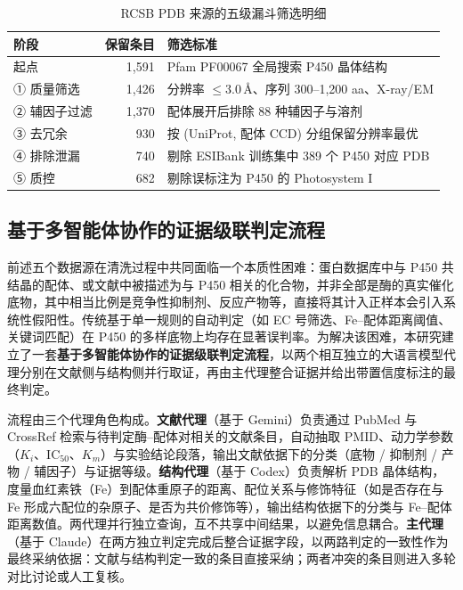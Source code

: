 \begin{table}[htbp]
  \centering
  \caption{RCSB PDB 来源的五级漏斗筛选明细}
  \label{tab:ch3-rcsb-funnel}
  \begin{tabular}{lrl}
    \toprule
    阶段 & 保留条目 & 筛选标准 \\
    \midrule
    起点        & 1{,}591 & Pfam PF00067 全局搜索 P450 晶体结构 \\
    ① 质量筛选   & 1{,}426 & 分辨率 $\leq 3.0$\,\AA{}、序列 300--1{,}200 aa、X-ray/EM \\
    ② 辅因子过滤 & 1{,}370 & 配体展开后排除 88 种辅因子与溶剂 \\
    ③ 去冗余     & 930   & 按 (UniProt, 配体 CCD) 分组保留分辨率最优 \\
    ④ 排除泄漏   & 740   & 剔除 ESIBank 训练集中 389 个 P450 对应 PDB \\
    ⑤ 质控       & 682   & 剔除误标注为 P450 的 Photosystem I \\
    \bottomrule
  \end{tabular}
\end{table}

\subsection{基于多智能体协作的证据级联判定流程}
\label{sec:multiagent}

前述五个数据源在清洗过程中共同面临一个本质性困难：蛋白数据库中与 P450 共结晶的配体、或文献中被描述为与 P450 相关的化合物，并非全部是酶的真实催化底物，其中相当比例是竞争性抑制剂、反应产物等，直接将其计入正样本会引入系统性假阳性。传统基于单一规则的自动判定（如 EC 号筛选、Fe--配体距离阈值、关键词匹配）在 P450 的多样底物上均存在显著误判率。为解决该困难，本研究建立了一套\textbf{基于多智能体协作的证据级联判定流程}，以两个相互独立的大语言模型代理分别在文献侧与结构侧并行取证，再由主代理整合证据并给出带置信度标注的最终判定。

流程由三个代理角色构成。\textbf{文献代理}（基于 Gemini）负责通过 PubMed 与 CrossRef 检索与待判定酶--配体对相关的文献条目，自动抽取 PMID、动力学参数（$K_i$、$\mathrm{IC}_{50}$、$K_m$）与实验结论段落，输出文献依据下的分类（底物 / 抑制剂 / 产物 / 辅因子）与证据等级。\textbf{结构代理}（基于 Codex）负责解析 PDB 晶体结构，度量血红素铁（Fe）到配体重原子的距离、配位关系与修饰特征（如是否存在与 Fe 形成六配位的杂原子、是否为共价修饰等），输出结构依据下的分类与 Fe--配体距离数值。两代理并行独立查询，互不共享中间结果，以避免信息耦合。\textbf{主代理}（基于 Claude）在两方独立判定完成后整合证据字段，以两路判定的一致性作为最终采纳依据：文献与结构判定一致的条目直接采纳；两者冲突的条目则进入多轮对比讨论或人工复核。

